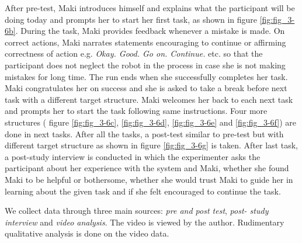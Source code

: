 After pre-test, Maki introduces himself and explains what the participant will be doing today and prompts her to start her first task, as shown in figure \ref{fig:fig_3-6b}. During the task, Maki provides feedback whenever a mistake is made. On correct actions, Maki narrates statements encouraging to continue or affirming correctness of action e.g. \emph{Okay. Good. Go on. Continue.} etc. so that the participant does not neglect the robot in the process in case she is not making mistakes for long time. The run ends when she successfully completes her task. Maki congratulates her on success and she is asked to take a break before next task with a different target structure. Maki welcomes her back to each next task and prompts her to start the task following same instructions. Four more structures ( figure \ref{fig:fig_3-6c}, \ref{fig:fig_3-6d}, \ref{fig:fig_3-6e} and \ref{fig:fig_3-6f}) are done in next tasks. After all the tasks, a post-test similar to pre-test but with different target structure as shown in figure \ref{fig:fig_3-6g} is taken. After last task, a post-study interview is conducted in which the experimenter asks the participant about her experience with the system and Maki, whether she found Maki to be helpful or bothersome, whether she would trust Maki to guide her in learning about the given task and if she felt encouraged to continue the task. 

We collect data through three main sources: \textit{pre and post test}, \textit{post- study interview} and \textit{video analysis}. The video is viewed by the author. Rudimentary qualitative analysis is done on the video data. 

